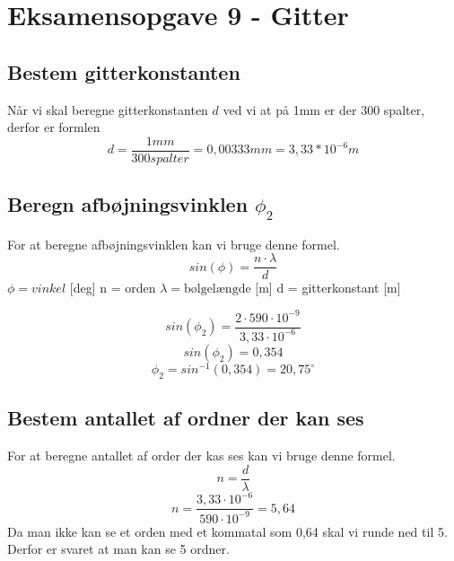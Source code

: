 \newpage
\section{Eksamensopgave 9 - Gitter}
\subsection{Bestem gitterkonstanten}
Når vi skal beregne gitterkonstanten \begin{math}d\end{math} ved vi at på 1mm er der 300 spalter, derfor er formlen
\begin{equation*}
    d=\frac{1mm}{300 spalter} = 0,00333mm = 3,33 * 10^{-6} m
\end{equation*}


\subsection{Beregn afbøjningsvinklen \begin{math}\phi_{2}\end{math}}
For at beregne afbøjningsvinklen kan vi bruge denne formel.
\begin{equation*}
    sin(\phi)=\frac{n\cdot\lambda}{d}
\end{equation*}
\begin{math}\phi = vinkel\end{math} [deg]\newline
n = orden\newline
\begin{math}\lambda = \text{bølgelængde}\end{math} [m]\newline
d = gitterkonstant [m]\newline

\begin{equation*}
    sin(\phi_{2})=\frac{2\cdot 590\cdot 10^{-9}}{3,33\cdot 10^{-6}}
\end{equation*}
\begin{equation*}
    sin(\phi_{2})=0,354
\end{equation*}
\begin{equation*}
    \phi_{2}=sin^{-1}(0,354)=20,75^{\circ}
\end{equation*}
\subsection{Bestem antallet af ordner der kan ses}
For at beregne antallet af order der kas ses kan vi bruge denne formel.
\begin{equation*}
    n=\frac{d}{\lambda}
\end{equation*}
\begin{equation*}
    n=\frac{3,33\cdot 10^{-6}}{590\cdot 10^{-9}} = 5,64
\end{equation*}
Da man ikke kan se et orden med et kommatal som 0,64 skal vi runde ned til 5. Derfor er svaret at man kan se 5 ordner.

\newpage
